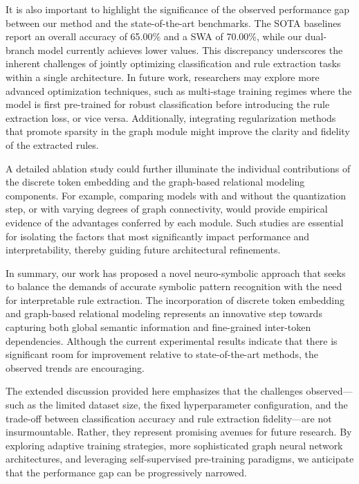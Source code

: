 \documentclass{article}
\begin{document}
It is also important to highlight the significance of the observed performance gap between our method and the state-of-the-art benchmarks. The SOTA baselines report an overall accuracy of 65.00\% and a SWA of 70.00\%, while our dual-branch model currently achieves lower values. This discrepancy underscores the inherent challenges of jointly optimizing classification and rule extraction tasks within a single architecture. In future work, researchers may explore more advanced optimization techniques, such as multi-stage training regimes where the model is first pre-trained for robust classification before introducing the rule extraction loss, or vice versa. Additionally, integrating regularization methods that promote sparsity in the graph module might improve the clarity and fidelity of the extracted rules.

A detailed ablation study could further illuminate the individual contributions of the discrete token embedding and the graph-based relational modeling components. For example, comparing models with and without the quantization step, or with varying degrees of graph connectivity, would provide empirical evidence of the advantages conferred by each module. Such studies are essential for isolating the factors that most significantly impact performance and interpretability, thereby guiding future architectural refinements.

In summary, our work has proposed a novel neuro-symbolic approach that seeks to balance the demands of accurate symbolic pattern recognition with the need for interpretable rule extraction. The incorporation of discrete token embedding and graph-based relational modeling represents an innovative step towards capturing both global semantic information and fine-grained inter-token dependencies. Although the current experimental results indicate that there is significant room for improvement relative to state-of-the-art methods, the observed trends are encouraging.

The extended discussion provided here emphasizes that the challenges observed—such as the limited dataset size, the fixed hyperparameter configuration, and the trade-off between classification accuracy and rule extraction fidelity—are not insurmountable. Rather, they represent promising avenues for future research. By exploring adaptive training strategies, more sophisticated graph neural network architectures, and leveraging self-supervised pre-training paradigms, we anticipate that the performance gap can be progressively narrowed.
\end{document}
